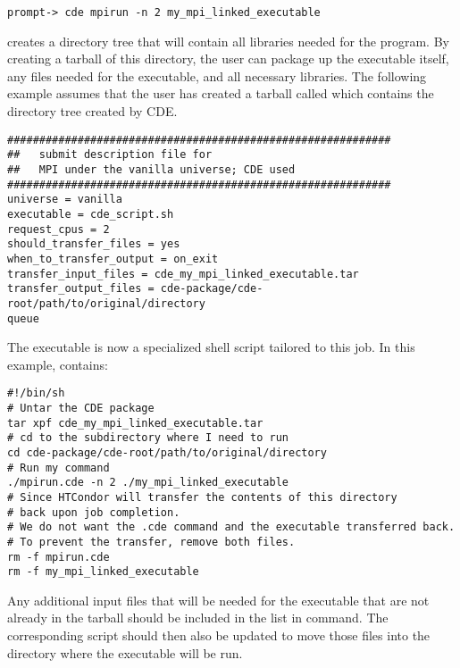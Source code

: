 \footnotesize
\begin{verbatim}
prompt-> cde mpirun -n 2 my_mpi_linked_executable
\end{verbatim}
\normalsize

creates a directory tree that will contain all libraries needed for the 
program.
By creating a tarball of this directory, the user can package up
the executable itself, 
any files needed for the executable, 
and all necessary libraries. 
The following example assumes that the user has created a 
tarball called  which contains the 
directory tree created by CDE.

\footnotesize
\begin{verbatim}
############################################################
##   submit description file for 
##   MPI under the vanilla universe; CDE used
############################################################
universe = vanilla
executable = cde_script.sh
request_cpus = 2
should_transfer_files = yes
when_to_transfer_output = on_exit
transfer_input_files = cde_my_mpi_linked_executable.tar
transfer_output_files = cde-package/cde-root/path/to/original/directory
queue
\end{verbatim}
\normalsize

The executable is now a specialized shell script tailored to this job.
In this example,  contains:

\footnotesize
\begin{verbatim}
#!/bin/sh
# Untar the CDE package
tar xpf cde_my_mpi_linked_executable.tar
# cd to the subdirectory where I need to run
cd cde-package/cde-root/path/to/original/directory
# Run my command
./mpirun.cde -n 2 ./my_mpi_linked_executable
# Since HTCondor will transfer the contents of this directory
# back upon job completion.
# We do not want the .cde command and the executable transferred back.
# To prevent the transfer, remove both files.
rm -f mpirun.cde
rm -f my_mpi_linked_executable
\end{verbatim}
\normalsize

Any additional input files that will be needed for the executable
that are not already in the tarball
should be included in the list in  command. 
The corresponding script should then also be updated to move those files into
the directory where the executable will be run.


